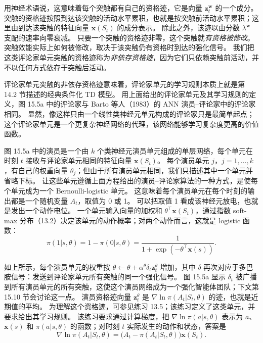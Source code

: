 \documentclass[UTF8,12pt,a4paper,fontset=fandol]{ctexart}
\begin{document}
用神经术语说，这意味着每个突触都有自己的资格迹，它是向量 $\mathbf{z}_t^{\mathbf{w}}$ 的一个成分。
突触的资格迹按照到达该突触的活动水平累积，也就是按突触前活动水平累积；这里由到达该突触的特征向量 $\mathbf{x}(S_t)$ 的成分表示。
除此之外，该迹以由分数 $\lambda^{\mathbf{w}}$ 支配的速率向零衰减。
只要一个突触的资格迹非零，这个突触就\textit{有资格被修改}。
突触效能实际上如何被修改，取决于该突触仍有资格时到达的强化信号。
我们把这类评论家单元突触的资格迹称为\textit{非依存资格迹}，因为它们只依赖突触前活动，并不以任何方式依存于突触后活动。

评论家单元突触的非依存资格迹意味着，评论家单元的学习规则本质上就是第 14.2 节描述的经典条件化 TD 模型。
用上面给出的评论家单元及其学习规则的定义，图 15.5a 中的评论家与 Barto 等人（1983）的 ANN 演员--评论家中的评论家相同。
显然，像这样只由一个线性类神经元单元构成的评论家只是最简单起点；这个评论家单元是一个更复杂神经网络的代理，该网络能够学习复杂度更高的价值函数。

图 15.5a 中的演员是一个由 $k$ 个类神经元演员单元组成的单层网络，每个单元在时刻 $t$ 接收与评论家单元相同的特征向量 $\mathbf{x}(S_t)$。
每个演员单元 $j$，$j=1,\ldots,k$，有自己的权重向量 $\theta_j$；但由于所有演员单元相同，我们只描述其中一个单元并省略下标。
让这些单元遵循上面方程给出的演员--评论家算法的一种方式，是使每个单元成为一个 Bernoulli-logistic 单元。
这意味着每个演员单元在每个时刻的输出都是一个随机变量 $A_t$，取值为 0 或 1。
可以把取值 1 看成该神经元放电，也就是发出一个动作电位。
一个单元输入向量的加权和 $\theta^\top\mathbf{x}(S_t)$，通过指数 soft-max 分布（13.2）决定该单元的动作概率；对两个动作而言，这就是 logistic 函数：
\begin{equation}
\pi(1|s,\theta)=1-\pi(0|s,\theta)=\frac{1}{1+\exp(-\theta^\top\mathbf{x}(s))}.
\tag{15.2}
\end{equation}

如上所示，每个演员单元的权重按 $\theta\leftarrow\theta+\alpha^\theta\delta_t\mathbf{z}_t^\theta$ 增加，其中 $\delta$ 再次对应于多巴胺信号：发送到评论家单元所有突触的同一个强化信号。
图 15.5a 显示 $\delta_t$ 被广播到所有演员单元的所有突触，这使这个演员网络成为一个强化智能体团队；下文第 15.10 节会讨论这一点。
演员资格迹向量 $\mathbf{z}_t^\theta$ 是 $\nabla\ln\pi(A_t|S_t,\theta)$ 的迹，也就是近期值的平均。
为理解这个资格迹，可参见练习 13.5；该练习定义了这类单元，并要求给出其学习规则。
该练习要求通过计算梯度，把 $\nabla\ln\pi(a|s,\theta)$ 表示为 $a$、$\mathbf{x}(s)$ 和 $\pi(a|s,\theta)$ 的函数；对时刻 $t$ 实际发生的动作和状态，答案是
\begin{equation}
\nabla\ln\pi(A_t|S_t,\theta)=\big(A_t-\pi(A_t|S_t,\theta)\big)\mathbf{x}(S_t).
\tag{15.3}
\end{equation}
\end{document}
